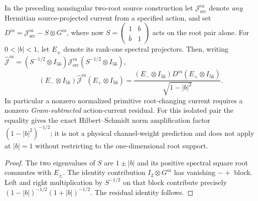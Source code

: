 \documentclass[12pt,a4paper]{article}
\begin{document}
\begin{corollary}
\label{p10:cor:v378-root-current-residual-certificate}
In the preceding nonsingular two-root source construction let
$\mathcal J_{\mathrm{src}}^{ia}$ denote \emph{any} Hermitian
source-projected current from a specified action, and set
$D^{ia}=\mathcal J_{\mathrm{src}}^{ia}-S\otimes G^{ia}$,
where now $S=\left(\begin{smallmatrix}1&b\\\bar b&1\end{smallmatrix}\right)$
acts on the root pair alone. For $0<|b|<1$, let $E_\pm$ denote its
rank-one spectral projectors. Then, writing
$\widehat{\mathcal J}^{ia}= (S^{-1/2}\otimes I_{56})
\mathcal J_{\mathrm{src}}^{ia}(S^{-1/2}\otimes I_{56})$,
\[
 \boxed{(E_-\otimes I_{56})\widehat{\mathcal J}^{ia}
 (E_+\otimes I_{56})=\frac{(E_-\otimes I_{56})D^{ia}
 (E_+\otimes I_{56})}{\sqrt{1-|b|^2}}.}
\]
In particular a nonzero normalized primitive root-changing current
requires a nonzero \emph{Gram-subtracted} action-current residual.
For this isolated pair the equality gives the exact Hilbert--Schmidt
norm amplification factor $(1-|b|^2)^{-1/2}$; it is not a physical
channel-weight prediction and does not apply at $|b|=1$ without
restricting to the one-dimensional root support.
\end{corollary}
\begin{proof}
The two eigenvalues of $S$ are $1\pm|b|$ and its positive spectral
square root commutes with $E_\pm$. The identity contribution
$I_2\otimes G^{ia}$ has vanishing $-+$ block. Left and right
multiplication by $S^{-1/2}$ on that block contribute precisely
$(1-|b|)^{-1/2}(1+|b|)^{-1/2}$. The residual identity follows.
\end{proof}

\end{document}
